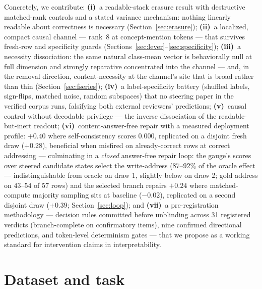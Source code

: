 \documentclass{article} %
\begin{document}
Concretely, we contribute:
\textbf{(i)}~a readable-stack erasure result with destructive
matched-rank controls and a stated variance mechanism: nothing linearly
readable about correctness is necessary (Section~\ref{sec:erasure});
\textbf{(ii)}~a localized, compact causal channel --- rank~8 at
concept-mention tokens --- that survives fresh-row and specificity
guards (Sections~\ref{sec:lever}--\ref{sec:specificity});
\textbf{(iii)}~a necessity dissociation: the same natural class-mean
vector is behaviorally null at full dimension and strongly reparative
concentrated into the channel --- and, in the removal direction,
content-necessity at the channel's site that is broad rather than thin
(Section~\ref{sec:fseries});
\textbf{(iv)}~a label-specificity battery (shuffled labels, sign-flips,
matched noise, random subspaces) that no steering paper in the verified
corpus runs, falsifying both external reviewers' predictions;
\textbf{(v)}~causal control without decodable privilege --- the inverse
dissociation of the readable-but-inert readout;
\textbf{(vi)}~content-answer-free repair with a measured deployment
profile: $+0.40$ where self-consistency scores $0.000$, replicated on
a disjoint fresh draw ($+0.28$), beneficial when misfired on
already-correct rows at correct addressing --- culminating in a
\emph{closed} answer-free repair loop: the gauge's scores over steered
candidate states select the write-address ($87$--$92\%$ of the
oracle effect --- indistinguishable from oracle on draw 1, slightly
below on draw 2; gold address on $43$--$54$ of $57$ rows) and the
selected branch repairs $+0.24$ where matched-compute majority
sampling sits at baseline ($-0.02$), replicated on a second disjoint
draw ($+0.39$;
Section~\ref{sec:loop}); and
\textbf{(vii)}~a pre-registration methodology --- decision rules
committed before unblinding across 31 registered verdicts
(branch-complete on confirmatory items), nine
confirmed directional predictions, and token-level determinism gates
--- that we propose as a working standard for intervention claims in
interpretability.

\section{Dataset and task}\label{sec:data}
\end{document}
